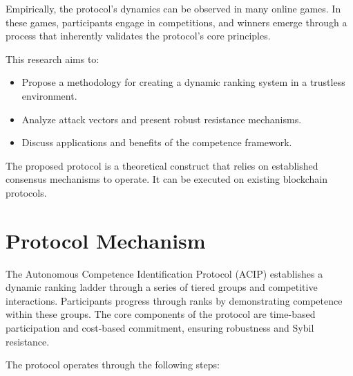 \documentclass{article}
\begin{document}
\begin{CJK}{UTF8}{gbsn}
    Empirically, the protocol's dynamics can be observed in many online games. In these games, participants engage in competitions, and winners emerge through a process that inherently validates the protocol's core principles.

    This research aims to:

    \begin{itemize}[nosep]
        \item Propose a methodology for creating a dynamic ranking system in a trustless environment.
        \item Analyze attack vectors and present robust resistance mechanisms.
        \item Discuss applications and benefits of the competence framework.
    \end{itemize}

    The proposed protocol is a theoretical construct that relies on established consensus mechanisms to operate. It can be executed on existing blockchain protocols.

    \section{Protocol Mechanism}

    The Autonomous Competence Identification Protocol (ACIP) establishes a dynamic ranking ladder through a series of tiered groups and competitive interactions. Participants progress through ranks by demonstrating competence within these groups. The core components of the protocol are time-based participation and cost-based commitment, ensuring robustness and Sybil resistance.

        {{ The protocol operates through the following steps: }}


\end{CJK}
\end{document}
